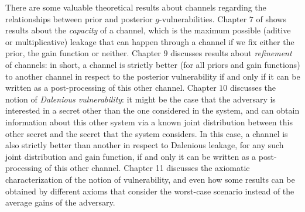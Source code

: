 There are some valuable theoretical results about channels regarding the relationships between prior and posterior $g$-vulnerabilities. Chapter $7$ of \cite{QIF} shows results about the \textit{capacity} of a channel, which is the maximum possible (aditive or multiplicative) leakage that can happen through a channel if we fix either the prior, the gain function or neither. Chapter $9$ discusses results about \textit{refinement} of channels: in short, a channel is strictly better (for all priors and gain functions) to another channel in respect to the posterior vulnerability if and only if it can be written as a post-processing of this other channel. Chapter $10$ discusses the notion of \textit{Dalenious vulnerability}: it might be the case that the adversary is interested in a secret other than the one considered in the system, and can obtain information about this other system via a known joint distribution between this other secret and the secret that the system considers. In this case, a channel is also strictly better than another in respect to Dalenious leakage, for any such joint distribution and gain function, if and only it can be written as a post-processing of this other channel. Chapter 11 \cite{QIF} discusses the axiomatic characterization of the notion of vulnerability, and even how some results can be obtained by different axioms that consider the worst-case scenario instead of the average gains of the adversary.



